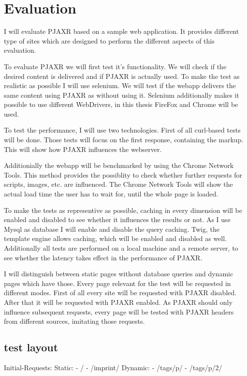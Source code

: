 \documentclass[f,bachelor,binding,twoside,palatino]{WeSTthesis}
\def \pjaxr {PJAXR}
\begin{document}
\section{Evaluation}
I will evaluate \pjaxr{} based on a sample web application.
It provides different type of sites which are designed to perform the different aspects of this evaluation.

To evaluate \pjaxr{} we will first test it's functionality.
We will check if the desired content is delivered and if \pjaxr{} is actually used.
To make the test as realistic as possible I will use selenium.
We will test if the webapp delivers the same content using \pjaxr{} as without using it.
Selenium additionally makes it possible to use different WebDrivers, in this thesis FireFox and Chrome will be used.

To test the performance, I will use two technologies.
First of all curl-based tests will be done.
Those tests will focus on the first response, containing the markup.
This will show how \pjaxr{} influences the webserver.

Additionially the webapp will be benchmarked by using the Chrome Network Tools.
This method provides the possiblity to check whether further requests for scripts, images, etc. are influenced.
The Chrome Network Tools will show the actual load time the user has to wait for, until the whole page is loaded.

To make the tests as representive as possible, caching in every dimension will be enabled and disabled to see whether it influences the results or not.
As I use Mysql as database I will enable and disable the query caching.
Twig, the template engine allows caching, which will be enabled and disabled as well.
Additionally all tests are performed on a local machine and a remote server, to see whether the latency takes effect in the performance of \pjaxr{}.


I will distinguish between static pages without database queries and dynamic pages which have those.
Every page relevant for the test will be requested in different modes.
First of all every site will be requested with \pjaxr{} disabled.
After that it will be requested with \pjaxr{} enabled.
As \pjaxr{} should only influence subsequent requests, every page will be tested with \pjaxr{} headers from different sources, imitating those requests.

\subsection{test layout}
  Initial-Requests:
    Static:
      - /
      - /imprint/
    Dynamic:
      - /tags/p/
      - /tags/p/2/
\end{document}
